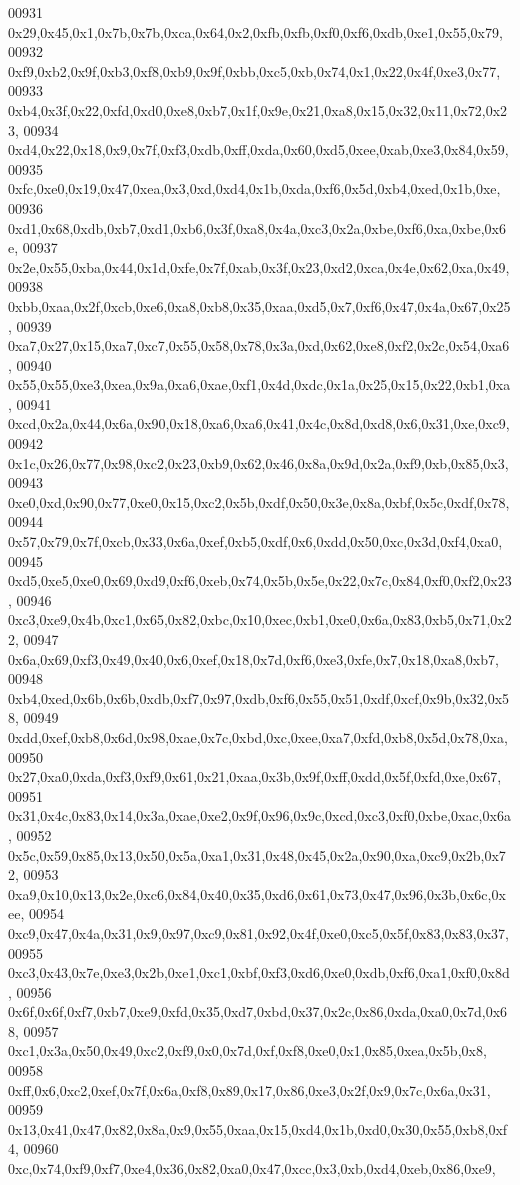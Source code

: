 \begin{DoxyCode}
00931   0x29,0x45,0x1,0x7b,0x7b,0xca,0x64,0x2,0xfb,0xfb,0xf0,0xf6,0xdb,0xe1,0x55,0x79,
00932   0xf9,0xb2,0x9f,0xb3,0xf8,0xb9,0x9f,0xbb,0xc5,0xb,0x74,0x1,0x22,0x4f,0xe3,0x77,
00933   0xb4,0x3f,0x22,0xfd,0xd0,0xe8,0xb7,0x1f,0x9e,0x21,0xa8,0x15,0x32,0x11,0x72,0x23,
00934   0xd4,0x22,0x18,0x9,0x7f,0xf3,0xdb,0xff,0xda,0x60,0xd5,0xee,0xab,0xe3,0x84,0x59,
00935   0xfc,0xe0,0x19,0x47,0xea,0x3,0xd,0xd4,0x1b,0xda,0xf6,0x5d,0xb4,0xed,0x1b,0xe,
00936   0xd1,0x68,0xdb,0xb7,0xd1,0xb6,0x3f,0xa8,0x4a,0xc3,0x2a,0xbe,0xf6,0xa,0xbe,0x6e,
00937   0x2e,0x55,0xba,0x44,0x1d,0xfe,0x7f,0xab,0x3f,0x23,0xd2,0xca,0x4e,0x62,0xa,0x49,
00938   0xbb,0xaa,0x2f,0xcb,0xe6,0xa8,0xb8,0x35,0xaa,0xd5,0x7,0xf6,0x47,0x4a,0x67,0x25,
00939   0xa7,0x27,0x15,0xa7,0xc7,0x55,0x58,0x78,0x3a,0xd,0x62,0xe8,0xf2,0x2c,0x54,0xa6,
00940   0x55,0x55,0xe3,0xea,0x9a,0xa6,0xae,0xf1,0x4d,0xdc,0x1a,0x25,0x15,0x22,0xb1,0xa,
00941   0xcd,0x2a,0x44,0x6a,0x90,0x18,0xa6,0xa6,0x41,0x4c,0x8d,0xd8,0x6,0x31,0xe,0xc9,
00942   0x1c,0x26,0x77,0x98,0xc2,0x23,0xb9,0x62,0x46,0x8a,0x9d,0x2a,0xf9,0xb,0x85,0x3,
00943   0xe0,0xd,0x90,0x77,0xe0,0x15,0xc2,0x5b,0xdf,0x50,0x3e,0x8a,0xbf,0x5c,0xdf,0x78,
00944   0x57,0x79,0x7f,0xcb,0x33,0x6a,0xef,0xb5,0xdf,0x6,0xdd,0x50,0xc,0x3d,0xf4,0xa0,
00945   0xd5,0xe5,0xe0,0x69,0xd9,0xf6,0xeb,0x74,0x5b,0x5e,0x22,0x7c,0x84,0xf0,0xf2,0x23,
00946   0xc3,0xe9,0x4b,0xc1,0x65,0x82,0xbc,0x10,0xec,0xb1,0xe0,0x6a,0x83,0xb5,0x71,0x22,
00947   0x6a,0x69,0xf3,0x49,0x40,0x6,0xef,0x18,0x7d,0xf6,0xe3,0xfe,0x7,0x18,0xa8,0xb7,
00948   0xb4,0xed,0x6b,0x6b,0xdb,0xf7,0x97,0xdb,0xf6,0x55,0x51,0xdf,0xcf,0x9b,0x32,0x58,
00949   0xdd,0xef,0xb8,0x6d,0x98,0xae,0x7c,0xbd,0xc,0xee,0xa7,0xfd,0xb8,0x5d,0x78,0xa,
00950   0x27,0xa0,0xda,0xf3,0xf9,0x61,0x21,0xaa,0x3b,0x9f,0xff,0xdd,0x5f,0xfd,0xe,0x67,
00951   0x31,0x4c,0x83,0x14,0x3a,0xae,0xe2,0x9f,0x96,0x9c,0xcd,0xc3,0xf0,0xbe,0xac,0x6a,
00952   0x5c,0x59,0x85,0x13,0x50,0x5a,0xa1,0x31,0x48,0x45,0x2a,0x90,0xa,0xc9,0x2b,0x72,
00953   0xa9,0x10,0x13,0x2e,0xc6,0x84,0x40,0x35,0xd6,0x61,0x73,0x47,0x96,0x3b,0x6c,0xee,
00954   0xc9,0x47,0x4a,0x31,0x9,0x97,0xc9,0x81,0x92,0x4f,0xe0,0xc5,0x5f,0x83,0x83,0x37,
00955   0xc3,0x43,0x7e,0xe3,0x2b,0xe1,0xc1,0xbf,0xf3,0xd6,0xe0,0xdb,0xf6,0xa1,0xf0,0x8d,
00956   0x6f,0x6f,0xf7,0xb7,0xe9,0xfd,0x35,0xd7,0xbd,0x37,0x2c,0x86,0xda,0xa0,0x7d,0x68,
00957   0xc1,0x3a,0x50,0x49,0xc2,0xf9,0x0,0x7d,0xf,0xf8,0xe0,0x1,0x85,0xea,0x5b,0x8,
00958   0xff,0x6,0xc2,0xef,0x7f,0x6a,0xf8,0x89,0x17,0x86,0xe3,0x2f,0x9,0x7c,0x6a,0x31,
00959   0x13,0x41,0x47,0x82,0x8a,0x9,0x55,0xaa,0x15,0xd4,0x1b,0xd0,0x30,0x55,0xb8,0xf4,
00960   0xc,0x74,0xf9,0xf7,0xe4,0x36,0x82,0xa0,0x47,0xcc,0x3,0xb,0xd4,0xeb,0x86,0xe9,

\end{DoxyCode}
